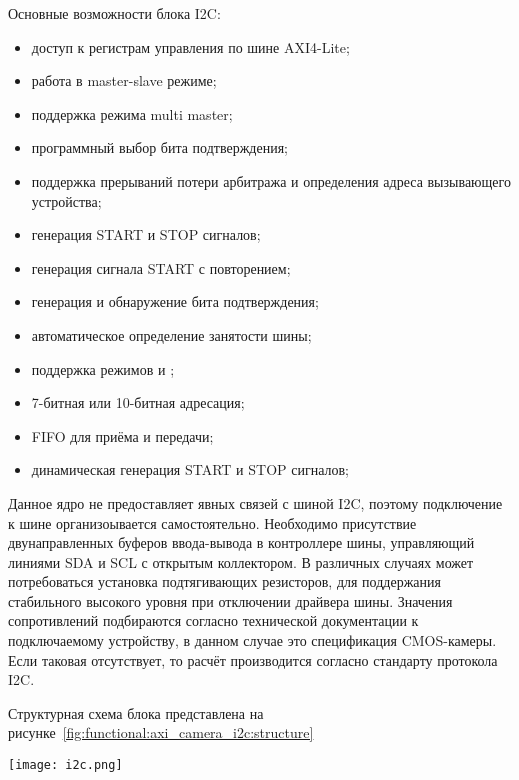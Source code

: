 Основные возможности блока I2C:
\begin{itemize}
  \item доступ к регистрам управления по шине AXI4-Lite;
  \item работа в master-slave режиме;
  \item поддержка режима multi master;
  \item программный выбор бита подтверждения;
  \item поддержка прерываний потери арбитража и определения адреса вызывающего устройства;
  \item генерация START и STOP сигналов;
  \item генерация сигнала START с повторением;
  \item генерация и обнаружение бита подтверждения;
  \item автоматическое определение занятости шины;
  \item поддержка режимов  и ;
  \item 7-битная или 10-битная адресация;
  \item FIFO для приёма и передачи;
  \item динамическая генерация START и STOP сигналов;
\end{itemize}

Данное ядро не предоставляет явных связей с шиной I2C, поэтому подключение к шине организоывается
самостоятельно. Необходимо присутствие двунаправленных буферов ввода-вывода в контроллере шины,
управляющий линиями SDA и SCL с открытым коллектором. В различных случаях может потребоваться
установка подтягивающих резисторов, для поддержания стабильного высокого уровня при отключении
драйвера шины. Значения сопротивлений подбираются согласно технической документации к подключаемому
устройству, в данном случае это спецификация CMOS-камеры. Если таковая отсутствует, то расчёт
производится согласно стандарту протокола I2C.

Структурная схема блока представлена на рисунке~\ref{fig:functional:axi_camera_i2c:structure}

\begin{center}
  \centering
  \texttt{[image: i2c.png]}
  \label{fig:functional:axi_camera_i2c:structure}
\end{center}

